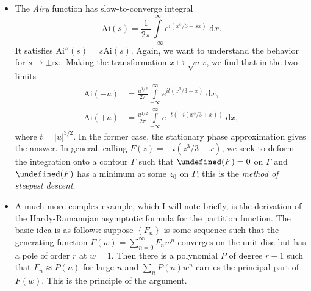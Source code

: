 \documentclass[11pt,
        usenames, %
        dvipsnames %
    ]{report}
\newcommand*{\abs}[1]{\left|#1\right|}
\newcommand*{\p}[1]{\left(#1\right)}
\newcommand*{\z}[1]{\left\{#1\right\}}
\let\Re\undefined
\let\Im\undefined
\DeclareMathOperator{\Re}{Re}
\DeclareMathOperator{\Im}{Im}
\begin{document}
\begin{itemize}
    \item The \emph{Airy} function has slow-to-converge integral
        \begin{equation}
            \mathrm{Ai}(s) = \frac{1}{2\pi}\int\limits_{-\infty}^\infty
                e^{i\p{x^3/3 + sx}}\;\mathrm{d}x.
        \end{equation}
        It satisfies $\mathrm{Ai}''(s) = s\mathrm{Ai}(s)$. Again, we want to
        understand the behavior for $s \to \pm \infty$. Making the
        transformation $x \mapsto \sqrt{u}x$, we find that in the two limits
        \begin{align}
            \mathrm{Ai}\p{-u} &= \frac{u^{1/2}}{2\pi} \int\limits_{-\infty}
                ^\infty e^{it\p{x^3/3 - x}}\;\mathrm{d}x,\\
            \mathrm{Ai}\p{+u} &= \frac{u^{1/2}}{2\pi} \int\limits_{-\infty}
                ^\infty e^{-t\p{-i(x^3/3 + x)}}\;\mathrm{d}x,
        \end{align}
        where $t = \abs{u}^{3/2}$. In the former case, the stationary phase
        approximation gives the answer. In general, calling $F(z) = -i(z^3/3 +
        x)$, we seek to deform the integration onto a contour $\Gamma$ such that
        $\Im(F) = 0$ on $\Gamma$ and $\Re(F)$ has a minimum at some $z_0$ on
        $\Gamma$; this is the \emph{method of steepest descent}.

    \item A much more complex example, which I will note briefly, is the
        derivation of the Hardy-Ramanujan asymptotic formula for the partition
        function. The basic idea is as follows: suppose $\z{F_n}$ is some
        sequence such that the generating function $F(w) = \sum\limits_{n =
        0}^\infty F_nw^n$ converges on the unit disc but has a pole of order $r$
        at $w = 1$. Then there is a polynomial $P$ of degree $r - 1$ such that
        $F_n \approx P(n)$ for large $n$ and $\sum\limits_n P(n) w^n$ carries
        the principal part of $F(w)$. This is the principle of the argument.


\end{itemize}
\end{document}
